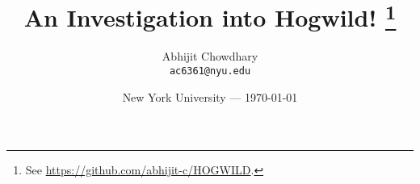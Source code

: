 \documentclass[12pt]{article}
\newcommand{\hogwild}{H{\sc ogwild}!}
\begin{document}
 
\title{An Investigation into \hogwild%
\footnote{
  See \url{https://github.com/abhijit-c/HOGWILD}.
}
}
\author{%
  Abhijit Chowdhary \\
  \texttt{ac6361@nyu.edu}
}
\date{New York University --- \today}

\maketitle

\tableofcontents
\clearpage


 





\clearpage
{}
{}

\end{document}
